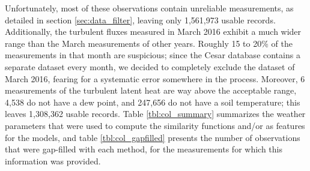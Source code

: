\documentclass[12pt]{book}
\begin{document}
Unfortunately, most of these observations contain unreliable measurements, as detailed in section \ref{sec:data_filter}, leaving only  1,561,973 usable records. Additionally, the turbulent fluxes measured in March 2016 exhibit a much wider range than the March measurements of other years. Roughly 15 to 20\% of the measurements in that month are suspicious; since the Cesar database contains a separate dataset every month, we decided to completely exclude the dataset of March 2016, fearing for a systematic error somewhere in the process. Moreover, 6 measurements of the turbulent latent heat are way above the acceptable range, 4,538 do not have a dew point, and 247,656 do not have a soil temperature; this leaves 1,308,362 usable records. Table \ref{tbl:col_summary} summarizes the weather parameters that were used to compute the similarity functions and/or as features for the models, and table \ref{tbl:col_gapfilled} presents the number of observations that were gap-filled with each method, for the measurements for which this information was provided.
\end{document}

